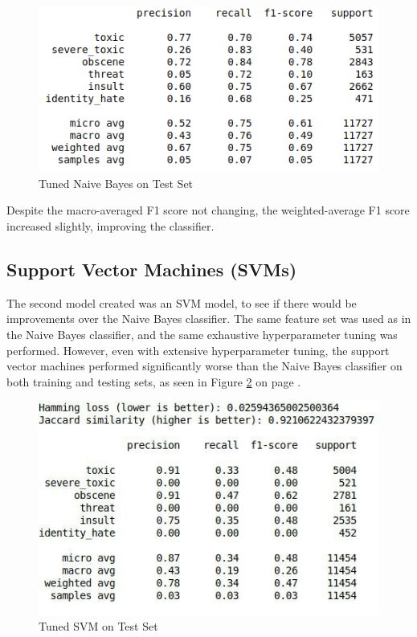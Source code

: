 \documentclass{article}
\begin{document}
{{	  \begin{figure}[h]
		  \centering
		  \includegraphics[width=\textwidth]{nb-test-set.png}
		  \caption{Tuned Naive Bayes on Test Set}
		  \label{fig:nb-test}
	  \end{figure}

	  Despite the macro-averaged F1 score not changing, the weighted-average F1
	  score increased slightly, improving the classifier.
  }
  \subsection{Support Vector Machines (SVMs)}{
    The second model created was an SVM model, to see if there would be 
    improvements over the Naive Bayes classifier. The same feature set was used
    as in the Naive Bayes classifier, and the same exhaustive hyperparameter 
    tuning was performed. However, even with extensive hyperparameter tuning, 
    the support vector machines performed significantly worse than the Naive 
    Bayes classifier on both training and testing sets, as seen in Figure 
    \ref{fig:svm-test} on page \pageref{fig:svm-test}.

    \begin{figure}[h]
      \centering
      \includegraphics[width=\textwidth]{svm-test-set.jpg}
      \caption{Tuned SVM on Test Set}
      \label{fig:svm-test}
    \end{figure}
  }
}
\end{document}
